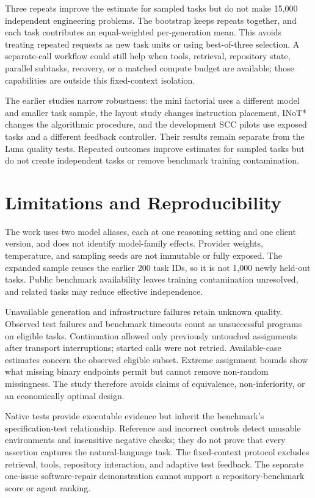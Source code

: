 Three repeats improve the estimate for sampled tasks but do not make 15,000 independent engineering problems. The bootstrap keeps repeats together, and each task contributes an equal-weighted per-generation mean. This avoids treating repeated requests as new task units or using best-of-three selection. A separate-call workflow could still help when tools, retrieval, repository state, parallel subtasks, recovery, or a matched compute budget are available; those capabilities are outside this fixed-context isolation.

The earlier studies narrow robustness: the mini factorial uses a different model and smaller task sample, the layout study changes instruction placement, INoT* changes the algorithmic procedure, and the development SCC pilots use exposed tasks and a different feedback controller. Their results remain separate from the Luna quality tests. Repeated outcomes improve estimates for sampled tasks but do not create independent tasks or remove benchmark training contamination.

\section{Limitations and Reproducibility}
The work uses two model aliases, each at one reasoning setting and one client version, and does not identify model-family effects. Provider weights, temperature, and sampling seeds are not immutable or fully exposed. The expanded sample reuses the earlier 200 task IDs, so it is not 1,000 newly held-out tasks. Public benchmark availability leaves training contamination unresolved, and related tasks may reduce effective independence.

Unavailable generation and infrastructure failures retain unknown quality. Observed test failures and benchmark timeouts count as unsuccessful programs on eligible tasks. Continuation allowed only previously untouched assignments after transport interruptions; started calls were not retried. Available-case estimates concern the observed eligible subset. Extreme assignment bounds show what missing binary endpoints permit but cannot remove non-random missingness. The study therefore avoids claims of equivalence, non-inferiority, or an economically optimal design.

Native tests provide executable evidence but inherit the benchmark's specification-test relationship. Reference and incorrect controls detect unusable environments and insensitive negative checks; they do not prove that every assertion captures the natural-language task. The fixed-context protocol excludes retrieval, tools, repository interaction, and adaptive test feedback. The separate one-issue software-repair demonstration cannot support a repository-benchmark score or agent ranking.

